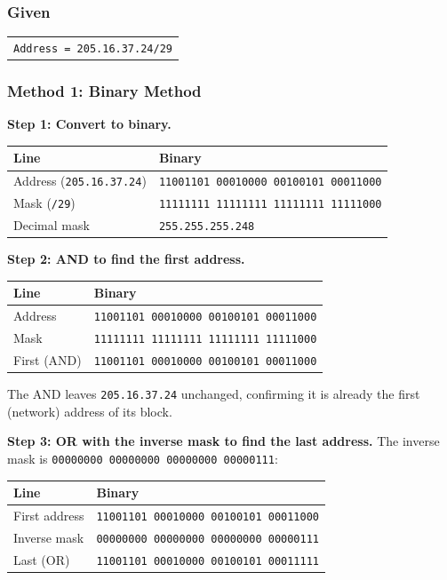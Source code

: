 \documentclass[11pt,a4paper]{article}
\begin{document}
\subsubsection*{Given}

\begin{tabularx}{\textwidth}{@{}X@{}}
\texttt{Address = 205.16.37.24/29} \\
\end{tabularx}

\subsubsection*{Method 1: Binary Method}

\textbf{Step 1: Convert to binary.}

\begin{tabularx}{\textwidth}{@{}lX@{}}
\toprule
\rowcolor{tablehead}\textbf{Line} & \textbf{Binary} \\
\midrule
Address (\texttt{205.16.37.24}) & \texttt{11001101 00010000 00100101 00011000} \\
Mask (\texttt{/29}) & \texttt{11111111 11111111 11111111 11111000} \\
Decimal mask & \texttt{255.255.255.248} \\
\bottomrule
\end{tabularx}

\textbf{Step 2: AND to find the first address.}

\begin{tabularx}{\textwidth}{@{}lX@{}}
\toprule
\rowcolor{tablehead}\textbf{Line} & \textbf{Binary} \\
\midrule
Address & \texttt{11001101 00010000 00100101 00011000} \\
Mask & \texttt{11111111 11111111 11111111 11111000} \\
First (AND) & \texttt{11001101 00010000 00100101 00011000} \\
\bottomrule
\end{tabularx}

The AND leaves \texttt{205.16.37.24} unchanged, confirming it is already the
first (network) address of its block.

\textbf{Step 3: OR with the inverse mask to find the last address.} The inverse
mask is \texttt{00000000 00000000 00000000 00000111}:

\begin{tabularx}{\textwidth}{@{}lX@{}}
\toprule
\rowcolor{tablehead}\textbf{Line} & \textbf{Binary} \\
\midrule
First address & \texttt{11001101 00010000 00100101 00011000} \\
Inverse mask & \texttt{00000000 00000000 00000000 00000111} \\
Last (OR) & \texttt{11001101 00010000 00100101 00011111} \\
\bottomrule
\end{tabularx}
\end{document}

